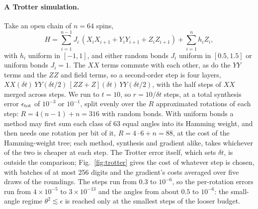 \documentclass[aps,prx,twocolumn,superscriptaddress,nofootinbib,longbibliography]{revtex4-2}
\theoremstyle{remark}
\begin{document}
\paragraph*{A Trotter simulation.}
Take an open chain of $n=64$ spins,
\begin{equation}
  H=\sum_{i=1}^{n-1}J_i\,(X_iX_{i+1}+Y_iY_{i+1}+Z_iZ_{i+1})+\sum_{i=1}^nh_iZ_i,
\end{equation}
with $h_i$ uniform in $[-1,1]$, and either random bonds $J_i$ uniform in $[0.5,1.5]$ or uniform
bonds $J_i=1$. The $XX$ terms commute with each other, as do the $YY$ terms and the $ZZ$ and
field terms, so a second-order step is four layers, $XX(\delta t)\,YY(\delta t/2)\,[ZZ+Z]
(\delta t)\,YY(\delta t/2)$, with the half steps of $XX$ merged across steps. We run to $t=10$,
so $r=10/\delta t$ steps, at a total synthesis error $\epsilon_{\rm tot}$ of $10^{-3}$ or
$10^{-1}$, split evenly over the $R$ approximated rotations of each step: $R=4(n-1)+n=316$ with
random bonds. With uniform bonds a method may first sum each class of 63 equal angles into its
Hamming weight, and then needs one rotation per bit of it, $R=4\cdot6+n=88$, at the cost of the
Hamming-weight tree; each method, synthesis and gradient alike, takes whichever of the two is
cheaper at each step. The Trotter error itself, which sets $\delta t$, is outside the comparison;
Fig.~\ref{fig:trotter} gives the cost of whatever step is chosen, with batches of at most 256
digits and the gradient's costs averaged over five draws of the roundings. The steps run from $0.3$ to
$10^{-6}$, so the per-rotation errors run from $4\times10^{-5}$ to $3\times10^{-13}$ and the angles from about
$0.5$ to $10^{-6}$: the small-angle regime $\theta^2\lesssim\epsilon$ is reached only at the
smallest steps of the looser budget.
\end{document}
